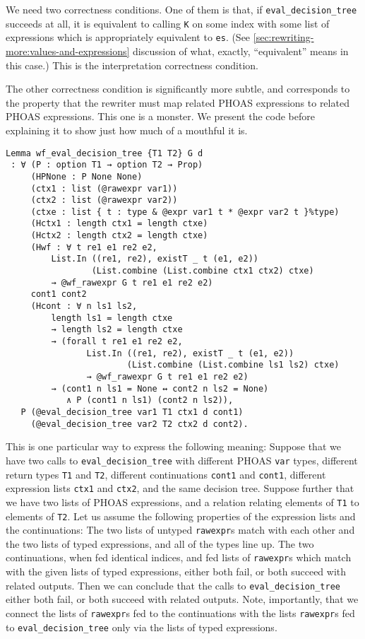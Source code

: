 We need two correctness conditions.
One of them is that, if \texttt{eval_decision_tree} succeeds at all, it is equivalent to calling \texttt{K} on some index with some list of expressions which is appropriately equivalent to \texttt{es}.
(See \autoref{sec:rewriting-more:values-and-expressions} discussion of what, exactly, ``equivalent'' means in this case.)
This is the interpretation correctness condition.

The other correctness condition is significantly more subtle, and corresponds to the property that the rewriter must map related PHOAS expressions to related PHOAS expressions.
This one is a monster.
We present the code before explaining it to show just how much of a mouthful it is.
\begin{verbatim}
Lemma wf_eval_decision_tree {T1 T2} G d
 : ∀ (P : option T1 → option T2 → Prop)
     (HPNone : P None None)
     (ctx1 : list (@rawexpr var1))
     (ctx2 : list (@rawexpr var2))
     (ctxe : list { t : type & @expr var1 t * @expr var2 t }%type)
     (Hctx1 : length ctx1 = length ctxe)
     (Hctx2 : length ctx2 = length ctxe)
     (Hwf : ∀ t re1 e1 re2 e2,
         List.In ((re1, re2), existT _ t (e1, e2))
                 (List.combine (List.combine ctx1 ctx2) ctxe)
         → @wf_rawexpr G t re1 e1 re2 e2)
     cont1 cont2
     (Hcont : ∀ n ls1 ls2,
         length ls1 = length ctxe
         → length ls2 = length ctxe
         → (forall t re1 e1 re2 e2,
                List.In ((re1, re2), existT _ t (e1, e2))
                        (List.combine (List.combine ls1 ls2) ctxe)
                → @wf_rawexpr G t re1 e1 re2 e2)
         → (cont1 n ls1 = None ↔ cont2 n ls2 = None)
            ∧ P (cont1 n ls1) (cont2 n ls2)),
   P (@eval_decision_tree var1 T1 ctx1 d cont1)
     (@eval_decision_tree var2 T2 ctx2 d cont2).
\end{verbatim}
This is one particular way to express the following meaning:
Suppose that we have two calls to \texttt{eval_decision_tree} with different PHOAS \texttt{var} types, different return types \texttt{T1} and \texttt{T2}, different continuations \texttt{cont1} and \texttt{cont1}, different expression lists \texttt{ctx1} and \texttt{ctx2}, and the same decision tree.
Suppose further that we have two lists of PHOAS expressions, and a relation relating elements of \texttt{T1} to elements of \texttt{T2}.
Let us assume the following properties of the expression lists and the continuations:
The two lists of untyped \texttt{rawexpr}s match with each other and the two lists of typed expressions, and all of the types line up.
The two continuations, when fed identical indices, and fed lists of \texttt{rawexpr}s which match with the given lists of typed expressions, either both fail, or both succeed with related outputs.
Then we can conclude that the calls to \texttt{eval_decision_tree} either both fail, or both succeed with related outputs.
Note, importantly, that we connect the lists of \texttt{rawexpr}s fed to the continuations with the lists \texttt{rawexpr}s fed to \texttt{eval_decision_tree} only via the lists of typed expressions.

